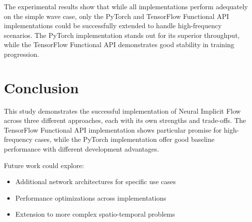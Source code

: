 \documentclass[10pt,journal,compsoc,onecolumn]{IEEEtran}
\begin{document}
The experimental results show that while all implementations perform adequately on the simple wave case, only the PyTorch and TensorFlow Functional API implementations could be successfully extended to handle high-frequency scenarios. The PyTorch implementation stands out for its superior throughput, while the TensorFlow Functional API demonstrates good stability in training progression.

\section{Conclusion}\label{sec:conclusion}
This study demonstrates the successful implementation of Neural Implicit Flow across three different approaches, each with its own strengths and trade-offs. The TensorFlow Functional API implementation shows particular promise for high-frequency cases, while the PyTorch implementation offer good baseline performance with different development advantages.

Future work could explore:
\begin{itemize}
    \item Additional network architectures for specific use cases
    \item Performance optimizations across implementations
    \item Extension to more complex spatio-temporal problems
\end{itemize}



\end{document}
